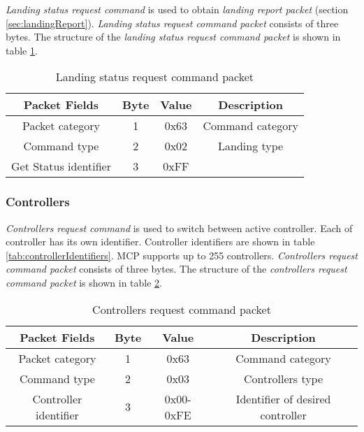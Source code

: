 \textit{Landing status request command} is used to obtain \textit{landing report packet} (section \ref{sec:landingReport}). \textit{Landing status request command packet} consists of three bytes. The structure of the \textit{landing status request command packet} is shown in table \ref{tab:landingStatusRequestCommandPacket}.
\begin{table}[h]
\begin{center}
\begin{tabular}{c c c c}
\toprule
\rowcolor[HTML]{FFFC9E} 
\textbf{Packet Fields} & \textbf{Byte} & \textbf{Value} & \textbf{Description}   \\ \midrule
Packet category        & 1             & 0x63                & Command category       \\ [1ex]
Command type           & 2             & 0x02                & Landing type           \\ [1ex]
Get Status identifier  & 3             & 0xFF                &                        \\ [1ex]\bottomrule
\end{tabular}
\end{center}
\caption{Landing status request command packet}
\label{tab:landingStatusRequestCommandPacket}
\end{table}

\subsubsection{Controllers}
\label{sec:controllersCommand}
\textit{Controllers request command} is used to switch between active controller. Each of controller has its own identifier. Controller identifiers are shown in table \ref{tab:controllerIdentifiers}. MCP supports up to 255 controllers. \textit{Controllers request command packet} consists of three bytes. The structure of the \textit{controllers request command packet} is shown in table \ref{tab:controllersReuqestCommandPacket}.
\begin{table}[h]
\begin{center}
\begin{tabular}{c c c c}
\toprule
\rowcolor[HTML]{FFFC9E} 
\textbf{Packet Fields} & \textbf{Byte} & \textbf{Value} & \textbf{Description}   \\ \midrule
Packet category        & 1             & 0x63                & Command category       \\ [1ex]
Command type           & 2             & 0x03                & Controllers type       \\ [1ex]
Controller identifier  & 3             & 0x00-0xFE           & Identifier of desired controller \\ [1ex] \bottomrule
\end{tabular}
\end{center}
\caption{Controllers request command packet}
\label{tab:controllersReuqestCommandPacket}
\end{table}

